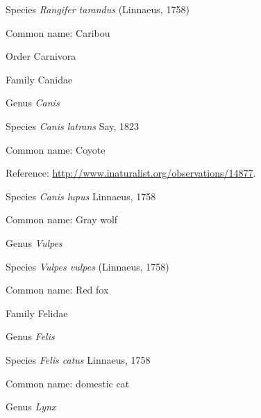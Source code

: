 \documentclass[9pt, article]{memoir}
\begin{document}
\begin{multicols}{2}
\vspace{6pt}\noindent\hspace{36pt}Species \textit{Rangifer tarandus} (Linnaeus, 1758)


Common name: Caribou

\vspace{6pt}\noindent\hspace{18pt}Order Carnivora


\vspace{6pt}\noindent\hspace{24pt}Family Canidae


\vspace{6pt}\noindent\hspace{30pt}Genus \textit{Canis}


\vspace{6pt}\noindent\hspace{36pt}Species \textit{Canis latrans} Say, 1823


Common name: Coyote

Reference: 
\url{http://www.inaturalist.org/observations/14877}.

\vspace{6pt}\noindent\hspace{36pt}Species \textit{Canis lupus} Linnaeus, 1758


Common name: Gray wolf

\vspace{6pt}\noindent\hspace{30pt}Genus \textit{Vulpes}


\vspace{6pt}\noindent\hspace{36pt}Species \textit{Vulpes vulpes} (Linnaeus, 1758)


Common name: Red fox

\vspace{6pt}\noindent\hspace{24pt}Family Felidae


\vspace{6pt}\noindent\hspace{30pt}Genus \textit{Felis}


\vspace{6pt}\noindent\hspace{36pt}Species \textit{Felis catus} Linnaeus, 1758


Common name: domestic cat

\vspace{6pt}\noindent\hspace{30pt}Genus \textit{Lynx}



\end{multicols}
\end{document}

